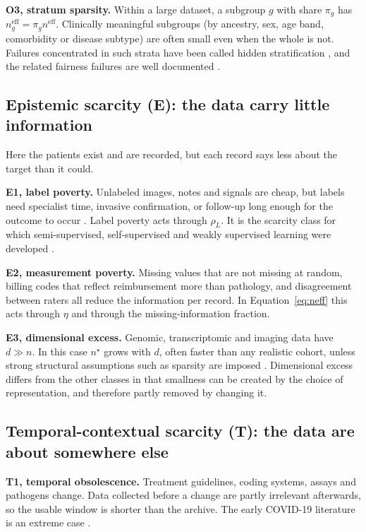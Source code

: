 \documentclass[acmsmall,screen,review]{acmart}
\newcommand{\eff}{\mathrm{eff}}
\theoremstyle{acmdefinition}
\begin{document}
\textbf{O3, stratum sparsity.} Within a large dataset, a subgroup $g$ with share $\pi_g$ has $n^{\eff}_g=\pi_g n^{\eff}$. Clinically meaningful subgroups (by ancestry, sex, age band, comorbidity or disease subtype) are often small even when the whole is not. Failures concentrated in such strata have been called hidden stratification \cite{oakdenrayner2020hidden}, and the related fairness failures are well documented \cite{chen2021ethical,obermeyer2019dissecting}.

\subsection{Epistemic scarcity (E): the data carry little information}

Here the patients exist and are recorded, but each record says less about the target than it could.

\textbf{E1, label poverty.} Unlabeled images, notes and signals are cheap, but labels need specialist time, invasive confirmation, or follow-up long enough for the outcome to occur \cite{willemink2020preparing}. Label poverty acts through $\rho_L$. It is the scarcity class for which semi-supervised, self-supervised and weakly supervised learning were developed \cite{cheplygina2019not,tajbakhsh2020embracing}.

\textbf{E2, measurement poverty.} Missing values that are not missing at random, billing codes that reflect reimbursement more than pathology, and disagreement between raters all reduce the information per record. In Equation~\eqref{eq:neff} this acts through $\eta$ and through the missing-information fraction.

\textbf{E3, dimensional excess.} Genomic, transcriptomic and imaging data have $d\gg n$. In this case $n^{\star}$ grows with $d$, often faster than any realistic cohort, unless strong structural assumptions such as sparsity are imposed \cite{buhlmann2011statistics,tibshirani1996regression}. Dimensional excess differs from the other classes in that smallness can be created by the choice of representation, and therefore partly removed by changing it.

\subsection{Temporal-contextual scarcity (T): the data are about somewhere else}

\textbf{T1, temporal obsolescence.} Treatment guidelines, coding systems, assays and pathogens change. Data collected before a change are partly irrelevant afterwards, so the usable window is shorter than the archive. The early COVID-19 literature is an extreme case \cite{roberts2021common,wynants2020prediction}.
\end{document}
